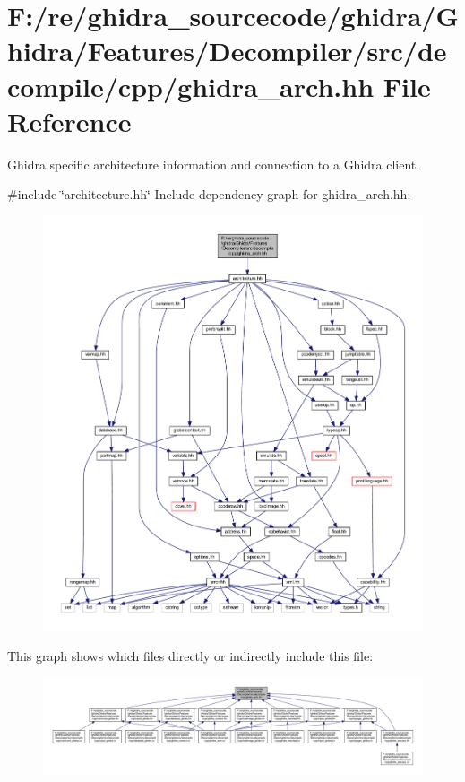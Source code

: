 \hypertarget{ghidra__arch_8hh}{}\section{F\+:/re/ghidra\+\_\+sourcecode/ghidra/\+Ghidra/\+Features/\+Decompiler/src/decompile/cpp/ghidra\+\_\+arch.hh File Reference}
\label{ghidra__arch_8hh}


Ghidra specific architecture information and connection to a Ghidra client.  


{\ttfamily \#include \char`\"{}architecture.\+hh\char`\"{}}\newline
Include dependency graph for ghidra\+\_\+arch.\+hh\+:
\nopagebreak
\begin{figure}[H]
\begin{center}
\leavevmode
\includegraphics[width=350pt]{ghidra__arch_8hh__incl}
\end{center}
\end{figure}
This graph shows which files directly or indirectly include this file\+:
\nopagebreak
\begin{figure}[H]
\begin{center}
\leavevmode
\includegraphics[width=350pt]{ghidra__arch_8hh__dep__incl}
\end{center}
\end{figure}
